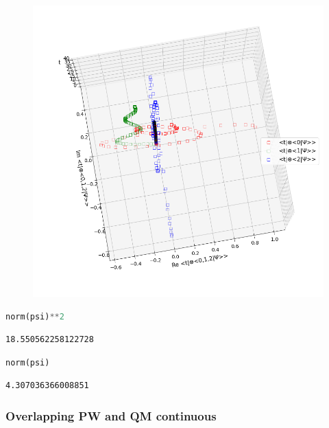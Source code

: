 \begin{figure}[h!]
\centering
\includegraphics[width=0.66\linewidth]{tex/appendix/nb/jupyter/3lev/output_64_1.png}

\end{figure}

\begin{lstlisting}[language=Python]
norm(psi)**2
\end{lstlisting}

\begin{lstlisting}
18.550562258122728
\end{lstlisting}

\begin{lstlisting}[language=Python]
norm(psi)
\end{lstlisting}

\begin{lstlisting}
4.307036366008851
\end{lstlisting}

\hypertarget{overlapping-pw-and-qm-continuous}{%
\subsubsection{Overlapping PW and QM
continuous}\label{overlapping-pw-and-qm-continuous}}


